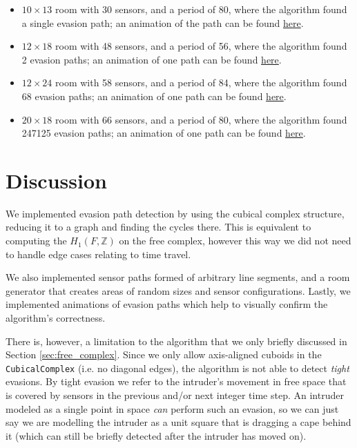 \documentclass{article}
\begin{document}
\begin{itemize}
  \item $10 \times 13$ room with 30 sensors, and a period of 80, where the algorithm found a single evasion path; an animation of the path can be found \href{https://github.com/MOj0/TDA_Evasion/blob/main/report/random_sensor_network_10x13_s30_p80_e1.gif}{here}.
  \item $12 \times 18$ room with 48 sensors, and a period of 56, where the algorithm found 2 evasion paths; an animation of one path can be found \href{https://github.com/MOj0/TDA_Evasion/blob/main/report/random_sensor_network_12x18_s48_p56_e2.gif}{here}.
  \item $12 \times 24$ room with 58 sensors, and a period of 84, where the algorithm found 68 evasion paths; an animation of one path can be found \href{https://github.com/MOj0/TDA_Evasion/blob/main/report/random_sensor_network_12x24_s58_p84_e68.gif}{here}.
  \item $20 \times 18$ room with 66 sensors, and a period of 80, where the algorithm found 247125 evasion paths; an animation of one path can be found \href{https://github.com/MOj0/TDA_Evasion/blob/main/report/random_sensor_network_20x18_s66_p80_e247125.gif}{here}.
\end{itemize}


\section{Discussion}

We implemented evasion path detection by using the cubical complex structure, reducing it to a graph and finding the cycles there.
This is equivalent to computing the $ H_1(F, \mathbb{Z})$ on the free complex, however this way we did not need to handle edge cases relating to time travel.

We also implemented sensor paths formed of arbitrary line segments, and a room generator that creates areas of random sizes and sensor configurations.
Lastly, we implemented animations of evasion paths which help to visually confirm the algorithm's correctness.

There is, however, a limitation to the algorithm that we only briefly discussed in Section \ref{sec:free_complex}.
Since we only allow axis-aligned cuboids in the \texttt{CubicalComplex} (i.e. no diagonal edges), the algorithm is not able to detect \textit{tight} evasions.
By tight evasion we refer to the intruder's movement in free space that is covered by sensors in the previous and/or next integer time step. An intruder modeled as a single point in space {\it can} perform such an evasion, so we can just say we are modelling the intruder as a unit square that is dragging a cape behind it (which can still be briefly detected after the intruder has moved on).
\end{document}
